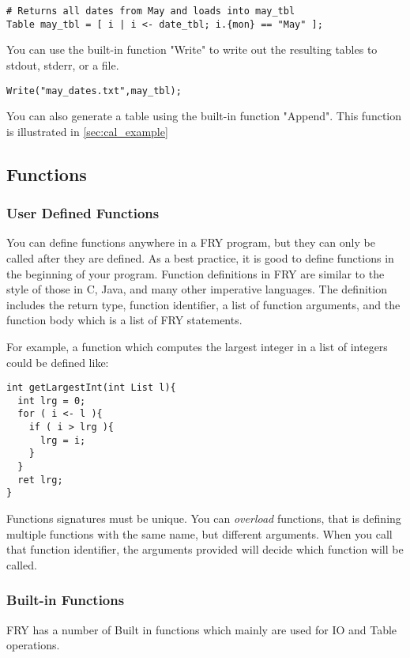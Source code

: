 \documentclass{article}
\begin{document}
\begin{lstlisting}
# Returns all dates from May and loads into may_tbl
Table may_tbl = [ i | i <- date_tbl; i.{mon} == "May" ];
\end{lstlisting}
You can use the built-in function "Write" to write out the resulting tables to stdout, stderr, or a file.
\begin{lstlisting}
Write("may_dates.txt",may_tbl);
\end{lstlisting}

You can also generate a table using the built-in function "Append". This function is illustrated in \ref{sec:cal_example}

\subsection{Functions}
\subsubsection{User Defined Functions}
You can define functions anywhere in a FRY program, but they can only be called after they are defined. As a best practice, it is good to define functions in the beginning of your program. Function definitions in FRY are similar to the style of those in C, Java, and many other imperative languages. The definition includes the return type, function identifier, a list of function arguments, and the function body which is a list of FRY statements. 

For example, a function which computes the largest integer in a list of integers could be defined like:
\begin{lstlisting}
int getLargestInt(int List l){                                                              
  int lrg = 0;
  for ( i <- l ){
    if ( i > lrg ){
      lrg = i;
    }
  }
  ret lrg;
}
\end{lstlisting}

Functions signatures must be unique. You can \emph{overload} functions, that is defining multiple functions with the same name, but different arguments. When you call that function identifier, the arguments provided will decide which function will be called.
\subsubsection{Built-in Functions}
FRY has a number of Built in functions which mainly are used for IO and Table operations.
\end{document}
